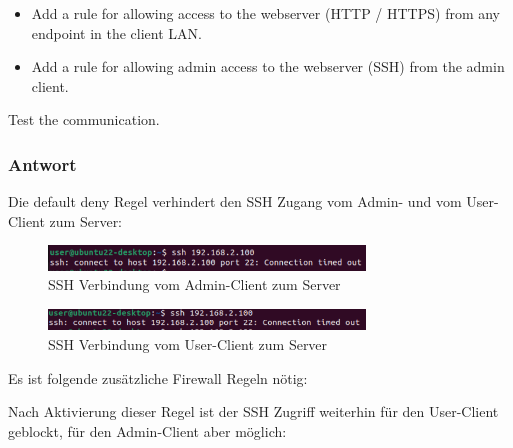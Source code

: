 \documentclass{article}
\begin{document}
\begin{itemize}
    \item Add a rule for allowing access to the webserver (HTTP / HTTPS) from any endpoint in the client LAN. 
    \item Add a rule for allowing admin access to the webserver (SSH) from the admin client. 
\end{itemize}

Test the communication. 

\subsubsection*{Antwort}

Die default deny Regel verhindert den SSH Zugang vom Admin- und vom User-Client zum Server:

\begin{figure}[H]
	\includegraphics[width=0.75\textwidth]{images/09}
	\centering
	\caption{SSH Verbindung vom Admin-Client zum Server}
\end{figure}

\begin{figure}[H]
	\includegraphics[width=0.75\textwidth]{images/10}
	\centering
	\caption{SSH Verbindung vom User-Client zum Server}
\end{figure}

Es ist folgende zusätzliche Firewall Regeln nötig:

\begin{center}
\end{center}

Nach Aktivierung dieser Regel ist der SSH Zugriff weiterhin für den User-Client 
geblockt, für den Admin-Client aber möglich:
\end{document}

